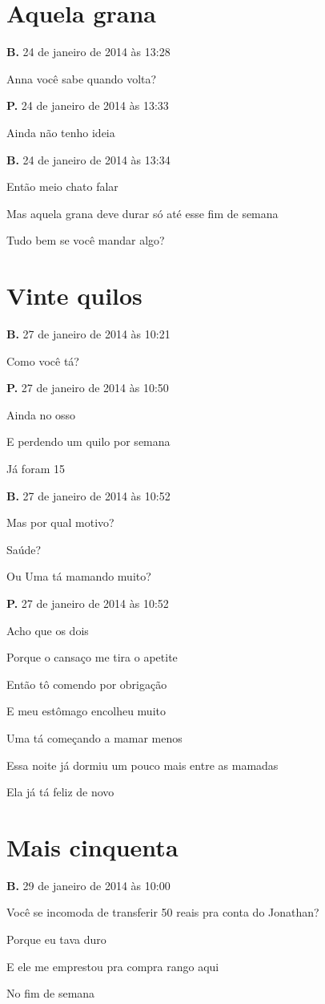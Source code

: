 \chapter{Aquela grana}

{\parindent0pt\parskip1pt\raggedright
\textbf{B.} 24 de janeiro de 2014 às 13:28

Anna você sabe quando volta?

\textbf{P.} 24 de janeiro de 2014 às 13:33

Ainda não tenho ideia

\textbf{B.} 24 de janeiro de 2014 às 13:34

Então meio chato falar

Mas aquela grana deve durar só até esse fim de semana

Tudo bem se você mandar algo?

\chapter{Vinte quilos}

\textbf{B.} 27 de janeiro de 2014 às 10:21

Como você tá?

\textbf{P.} 27 de janeiro de 2014 às 10:50

Ainda no osso

E perdendo um quilo por semana

Já foram 15

\textbf{B.} 27 de janeiro de 2014 às 10:52

Mas por qual motivo?

Saúde?

Ou Uma tá mamando muito?

\textbf{P.} 27 de janeiro de 2014 às 10:52

Acho que os dois

Porque o cansaço me tira o apetite

Então tô comendo por obrigação

E meu estômago encolheu muito

Uma tá começando a mamar menos

Essa noite já dormiu um pouco mais entre as mamadas

Ela já tá feliz de novo
}
\chapter{Mais cinquenta}

{\parindent0pt\parskip1pt\raggedright
\textbf{B.} 29 de janeiro de 2014 às 10:00

Você se incomoda de transferir 50 reais pra conta do Jonathan?

Porque eu tava duro

E ele me emprestou pra compra rango aqui

No fim de semana
}

